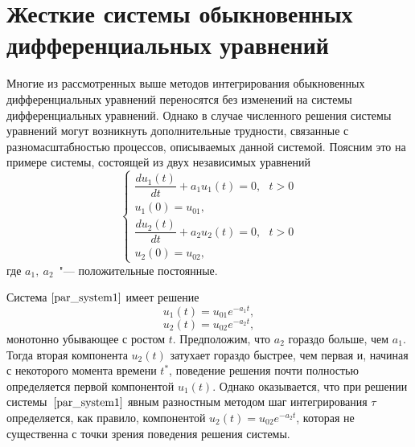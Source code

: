 \documentclass[11pt,a4paper,twoside]{report}
\numberwithin{equation}{section}
\theoremstyle{definition}
\theoremstyle{plain}
\begin{document}
\section{Жесткие системы обыкновенных дифференциальных уравнений}
%
Многие из рассмотренных выше методов интегрирования обыкновенных
дифференциальных уравнений переносятся без изменений на системы
дифференциальных уравнений. Однако в случае численного решения
системы уравнений могут возникнуть дополнительные трудности,
связанные с разномасштабностью процессов, описываемых данной
системой. Поясним это на примере системы, состоящей из двух
независимых уравнений
%
\begin{equation}
%
    \label{par_system1}
    \begin{cases}
        \dfrac{du_1(t)}{dt} + a_1u_1(t) = 0,~~~t > 0 \\
        u_1(0) = u_{01},\\
        \dfrac{du_2(t)}{dt} + a_2u_2(t) = 0,~~~t > 0\\
        u_2(0) = u_{02},
    \end{cases}
%
\end{equation}
%
где $a_1,~a_2$~"--- положительные постоянные.

Система $\eqref{par_system1}$ имеет решение
%
$$
    u_1(t)=u_{01}e^{-a_1t},
$$
%
$$
    u_2(t)=u_{02}e^{-a_2t},
$$
%
монотонно убывающее с ростом $t$. Предположим, что $a_2$ гораздо больше,
чем $a_1$. Тогда вторая компонента $u_2(t)$ затухает гораздо быстрее, чем
первая и, начиная с некоторого момента времени $t^*$, поведение решения
почти полностью определяется первой компонентой $u_1(t)$. Однако оказывается,
что при решении системы~$\eqref{par_system1}$ явным разностным методом шаг интегрирования
$\tau$ определяется, как правило, компонентой $u_2(t)=u_{02}e^{-a_2t}$,
которая не существенна с точки зрения поведения решения системы.
\vspace{1em}
\begin{figure}[H]
\centering
{}
\end{figure}
\vspace{1em}
\end{document}
